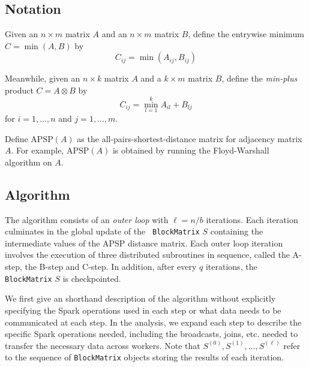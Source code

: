 \documentclass{article} %
\begin{document}
\subsection{Notation}

Given an $n \times m$ matrix $A$ and an $n \times m$ matrix $B$, define the entrywise minimum $C = \min(A, B)$ by
\[
C_{ij} = \min(A_{ij}, B_{ij})
\]

Meanwhile, given an $n \times k$ matrix $A$ and a $k \times m$ matrix $B$, define
the \emph{min-plus} product $C = A \otimes B$ by
\[
C_{ij} = \min_{l = 1}^k A_{il} + B_{lj}
\]
for $i = 1,\hdots, n$ and $j = 1,\hdots, m$.

Define $\text{APSP}(A)$ as the all-pairs-shortest-distance matrix for
adjacency matrix $A$.  For example, $\text{APSP}(A)$ is obtained by
running the Floyd-Warshall algorithm on $A$.

\subsection{Algorithm}

The algorithm consists of an \emph{outer loop} with $\ell = n/b$ iterations.
Each iteration culminates in the global update of the {\tt
  BlockMatrix} $S$ containing the intermediate values of the APSP
distance matrix.  Each outer loop iteration involves the execution of
three distributed subroutines in sequence, called the A-step, the
B-step and C-step.  In addition, after every $q$ iterations, the {\tt
  BlockMatrix} $S$ is checkpointed.

We first give an shorthand description of the algorithm without
explicitly specifying the Spark operations used in each step or what
data needs to be communicated at each step.  In the analysis, we
expand each step to describe the specific Spark operations needed,
including the broadcasts, joins, etc. needed to transfer the necessary
data across workers.  Note that $S^{(0)}, S^{(1)},\hdots,
S^{(\ell)}$ refer to the sequence of {\tt BlockMatrix} objects storing
the results of each iteration.
\end{document}
